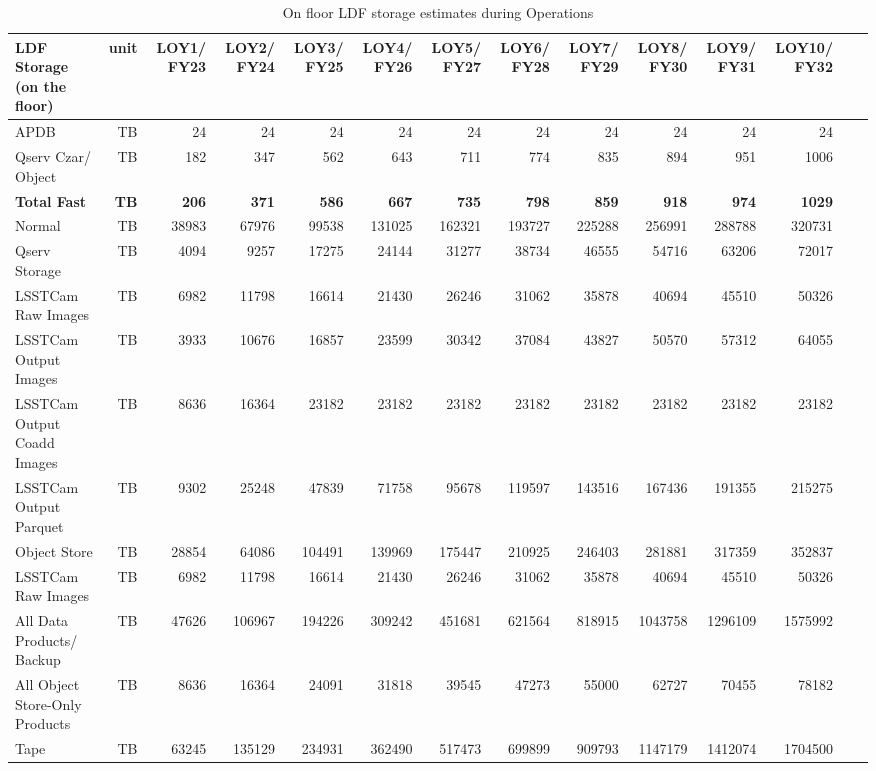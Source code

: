 \tiny \begin{longtable} { |p{}  |r  |r  |r  |r  |r  |r  |r  |r  |r  |r  |r  |r  |r |} 
\caption{On floor LDF storage estimates during Operations
 \label{tab:storageFloorOps}}\\ 
\hline 
\textbf{LDF Storage (on the floor)}&\textbf{unit}&\textbf{LOY1/ FY23}&\textbf{LOY2/ FY24}&\textbf{LOY3/ FY25}&\textbf{LOY4/ FY26}&\textbf{LOY5/ FY27}&\textbf{LOY6/ FY28}&\textbf{LOY7/ FY29}&\textbf{LOY8/ FY30}&\textbf{LOY9/ FY31}&\textbf{LOY10/ FY32}& \\ \hline
{APDB}&{TB}&{24}&{24}&{24}&{24}&{24}&{24}&{24}&{24}&{24}&{24}& \\ \hline
{Qserv Czar/ Object}&{TB}&{182}&{347}&{562}&{643}&{711}&{774}&{835}&{894}&{951}&{1006}& \\ \hline
\textbf{Total Fast}&\textbf{TB}&\textbf{206}&\textbf{371}&\textbf{586}&\textbf{667}&\textbf{735}&\textbf{798}&\textbf{859}&\textbf{918}&\textbf{974}&\textbf{1029}& \\ \hline
{Normal}&{TB}&{38983}&{67976}&{99538}&{131025}&{162321}&{193727}&{225288}&{256991}&{288788}&{320731}& \\ \hline
{Qserv Storage}&{TB}&{4094}&{9257}&{17275}&{24144}&{31277}&{38734}&{46555}&{54716}&{63206}&{72017}& \\ \hline
{LSSTCam Raw Images}&{TB}&{6982}&{11798}&{16614}&{21430}&{26246}&{31062}&{35878}&{40694}&{45510}&{50326}& \\ \hline
{LSSTCam Output Images}&{TB}&{3933}&{10676}&{16857}&{23599}&{30342}&{37084}&{43827}&{50570}&{57312}&{64055}& \\ \hline
{LSSTCam Output Coadd Images}&{TB}&{8636}&{16364}&{23182}&{23182}&{23182}&{23182}&{23182}&{23182}&{23182}&{23182}& \\ \hline
{LSSTCam Output Parquet}&{TB}&{9302}&{25248}&{47839}&{71758}&{95678}&{119597}&{143516}&{167436}&{191355}&{215275}& \\ \hline
{Object Store}&{TB}&{28854}&{64086}&{104491}&{139969}&{175447}&{210925}&{246403}&{281881}&{317359}&{352837}& \\ \hline
{LSSTCam Raw Images}&{TB}&{6982}&{11798}&{16614}&{21430}&{26246}&{31062}&{35878}&{40694}&{45510}&{50326}& \\ \hline
{All Data Products/ Backup}&{TB}&{47626}&{106967}&{194226}&{309242}&{451681}&{621564}&{818915}&{1043758}&{1296109}&{1575992}& \\ \hline
{All Object Store-Only Products}&{TB}&{8636}&{16364}&{24091}&{31818}&{39545}&{47273}&{55000}&{62727}&{70455}&{78182}& \\ \hline
{Tape}&{TB}&{63245}&{135129}&{234931}&{362490}&{517473}&{699899}&{909793}&{1147179}&{1412074}&{1704500}& \\ \hline
\end{longtable} \normalsize
